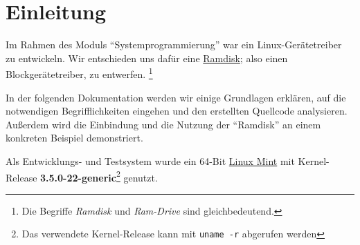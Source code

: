 \section{Einleitung}
\label{sec:einleitung}

Im Rahmen des Moduls \enquote{Systemprogrammierung} war ein Linux-Gerätetreiber zu entwickeln. Wir entschieden uns dafür eine \href{http://en.wikipedia.org/wiki/RAM_drive}{Ramdisk}; also einen Blockgerätetreiber, zu entwerfen. \footnote{Die Begriffe \emph{Ramdisk} und \emph{Ram-Drive} sind gleichbedeutend.}

In der folgenden Dokumentation werden wir einige Grundlagen erklären, auf die notwendigen Begrifflichkeiten eingehen und den erstellten Quellcode analysieren. Außerdem wird die Einbindung und die Nutzung der \enquote{Ramdisk} an einem konkreten Beispiel demonstriert.

Als Entwicklungs- und Testsystem wurde ein 64-Bit \href{http://www.linuxmint.com/}{Linux Mint} mit Kernel-Release \textbf{3.5.0-22-generic}\footnote{Das verwendete Kernel-Release kann mit \texttt{uname -r} abgerufen werden} genutzt.
